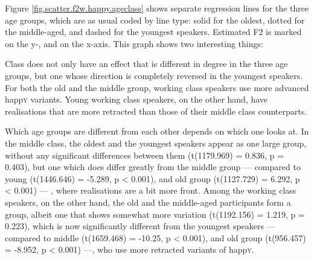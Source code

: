 Figure \ref{fig.scatter.f2w.happy.ageclass} shows separate regression lines for the three age groups, which are as usual coded by line type: solid for the oldest, dotted for the middle-aged, and dashed for the youngest speakers.
Estimated F2 is marked on the y-, and  on the x-axis.
This graph shows two interesting things:
\begin{inparaenum}[(1)]
	\item Class does not only have an effect that is different in degree in the three age groups, but one whose direction is completely reversed in the youngest speakers.
	For both the old and the middle group, working class speakers use more advanced happ\textsc{y} variants.
	Young working class speakers, on the other hand, have realisations that are more retracted than those of their middle class counterparts.
	\item Which age groups are different from each other depends on which  one looks at.
	In the middle class, the oldest and the youngest speakers appear as one large group, without any significant differences between them (t(1179.969) = 0.836, p = 0.403), but one which does differ greatly from the middle group --- compared to young (t(1446.646) = -5.289, p < 0.001), and old group (t(1127.729) = 6.292, p < 0.001) --- , where realisations are a bit more front.
	Among the working class speakers, on the other hand, the old and the middle-aged participants form a group, albeit one that shows somewhat more variation (t(1192.156) = 1.219, p = 0.223), which is now significantly different from the youngest speakers --- compared to middle (t(1659.468) = -10.25, p < 0.001), and old group (t(956.457) = -8.952, p < 0.001) ---, who use more retracted variants of happ\textsc{y}.
\end{inparaenum}

